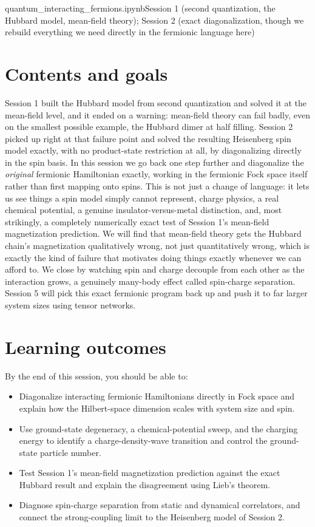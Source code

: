 \documentclass[all_sessions.tex]{subfiles}
\begin{document}
%
  {quantum\_interacting\_fermions.ipynb}{Session 1 (second quantization, the Hubbard model,
  mean-field theory); Session 2 (exact diagonalization, though we rebuild everything we need
  directly in the fermionic language here)}

\section*{Contents and goals}
Session 1 built the Hubbard model from second quantization and solved it at the mean-field level,
and it ended on a warning: mean-field theory can fail badly, even on the smallest possible
example, the Hubbard dimer at half filling. Session 2 picked up right at that failure point and
solved the resulting Heisenberg spin model exactly, with no product-state restriction at all, by
diagonalizing directly in the spin basis. In this session we go back one step further and
diagonalize the \emph{original} fermionic Hamiltonian exactly, working in the fermionic Fock space
itself rather than first mapping onto spins. This is not just a change of language: it lets us see
things a spin model simply cannot represent, charge physics, a real chemical potential, a genuine
insulator-versus-metal distinction, and, most strikingly, a completely numerically exact test of
Session 1's mean-field magnetization prediction. We will find that mean-field theory gets the
Hubbard chain's magnetization qualitatively wrong, not just quantitatively wrong, which is exactly
the kind of failure that motivates doing things exactly whenever we can afford to. We close by
watching spin and charge decouple from each other as the interaction grows, a genuinely many-body
effect called spin-charge separation. Session 5 will pick this exact fermionic program back up and
push it to far larger system sizes using tensor networks.

\section*{Learning outcomes}
By the end of this session, you should be able to:
\begin{itemize}[nosep]
  \item Diagonalize interacting fermionic Hamiltonians directly in Fock space and explain how the
    Hilbert-space dimension scales with system size and spin.
  \item Use ground-state degeneracy, a chemical-potential sweep, and the charging energy to
    identify a charge-density-wave transition and control the ground-state particle number.
  \item Test Session 1's mean-field magnetization prediction against the exact Hubbard result and
    explain the disagreement using Lieb's theorem.
  \item Diagnose spin-charge separation from static and dynamical correlators, and connect the
    strong-coupling limit to the Heisenberg model of Session 2.
\end{itemize}
\end{document}

